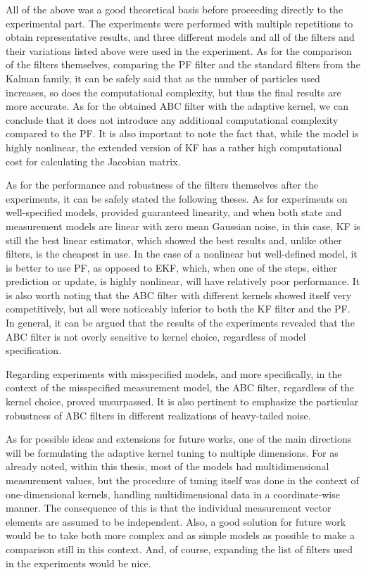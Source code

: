 All of the above was a good theoretical basis before proceeding directly to the experimental part. The experiments were performed with multiple repetitions to obtain representative results, and three different models and all of the filters and their variations listed above were used in the experiment. As for the comparison of the filters themselves, comparing the PF filter and the standard filters from the Kalman family, it can be safely said that as the number of particles used increases, so does the computational complexity, but thus the final results are more accurate. As for the obtained ABC filter with the adaptive kernel, we can conclude that it does not introduce any additional computational complexity compared to the PF. It is also important to note the fact that, while the model is highly nonlinear, the extended version of KF has a rather high computational cost for calculating the Jacobian matrix.

As for the performance and robustness of the filters themselves after the experiments, it can be safely stated the following theses. As for experiments on well-specified models, provided guaranteed linearity, and when both state and measurement models are linear with zero mean Gaussian noise, in this case, KF is still the best linear estimator, which showed the best results and, unlike other filters, is the cheapest in use. In the case of a nonlinear but well-defined model, it is better to use PF, as opposed to EKF, which, when one of the steps, either prediction or update, is highly nonlinear, will have relatively poor performance. It is also worth noting that the ABC filter with different kernels showed itself very competitively, but all were noticeably inferior to both the KF filter and the PF. In general, it can be argued that the results of the experiments revealed that the ABC filter is not overly sensitive to kernel choice, regardless of model specification.

Regarding experiments with misspecified models, and more specifically, in the context of the misspecified measurement model, the ABC filter, regardless of the kernel choice, proved unsurpassed. It is also pertinent to emphasize the particular robustness of ABC filters in different realizations of heavy-tailed noise.

As for possible ideas and extensions for future works, one of the main directions will be formulating the adaptive kernel tuning to multiple dimensions. For as already noted, within this thesis, most of the models had multidimensional measurement values, but the procedure of tuning itself was done in the context of one-dimensional kernels, handling multidimensional data in a coordinate-wise manner. The consequence of this is that the individual measurement vector elements are assumed to be independent. Also, a good solution for future work would be to take both more complex and as simple models as possible to make a comparison still in this context. And, of course, expanding the list of filters used in the experiments would be nice.